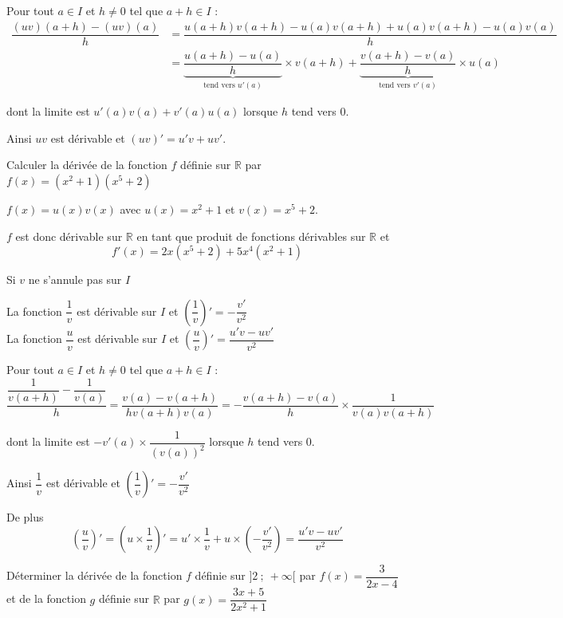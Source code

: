 \documentclass[french]{book}
\newcommand{\R}{\mathbb {R}}
\begin{document}
\begin{demo}
Pour tout $a\in I$ et $h\neq 0$ tel que $a+h\in I$ :
\begin{align*}
\dfrac{(uv)(a+h)-(uv)(a)}{h}&=\dfrac{u(a+h)v(a+h)-u(a)v(a+h)+u(a)v(a+h)-u(a)v(a)}{h}\\
&=\underbrace{\dfrac{u(a+h)-u(a)}{h}}_{\text{tend vers } u'(a)}\times v(a+h)+\underbrace{\dfrac{v(a+h)-v(a)}{h}}_{\text{tend vers } v'(a)}\times u(a)
\end{align*}

dont la limite est $u'(a)v(a)+v'(a)u(a)$ lorsque $h$ tend vers 0.

Ainsi $uv$ est dérivable et $(uv)'=u'v+uv'$.
\end{demo}

\begin{exemple}
Calculer la dérivée de la fonction $f$ définie sur $\R$ par $f(x)=(x^{2}+1)(x^{5}+2)$
\end{exemple}


$f(x)=u(x)v(x)$ avec $u(x)=x^{2}+1$ et $v(x)=x^{5}+2$.

$f$ est donc dérivable sur $\R$ en tant que produit de fonctions dérivables sur $\R$ et
\[f'(x)=2x(x^{5}+2)+5x^{4}(x^{2}+1)\]


\begin{prop}
Si $v$ ne s'annule pas sur $I$

La fonction $\dfrac{1}{v}$ est dérivable sur $I$ et  $\left(\dfrac{1}{v}\right)'=-\dfrac{v'}{v^{2}}$\\
La fonction $\dfrac{u}{v}$ est dérivable sur $I$ et  $\left(\dfrac{u}{v}\right)'=\dfrac{u'v-uv'}{v^{2}}$
\end{prop}

\begin{demo}
Pour tout $a\in I$ et $h\neq 0$ tel que $a+h\in I$ :
\[\dfrac{\dfrac{1}{v(a+h)}-\dfrac{1}{v(a)}}{h}=\dfrac{v(a)-v(a+h)}{hv(a+h)v(a)}=-\dfrac{v(a+h)-v(a)}{h}\times \dfrac{1}{v(a)v(a+h)}\]

dont la limite est $-v'(a)\times \dfrac{1}{(v(a))^{2}}$ lorsque $h$ tend vers 0.

Ainsi $\dfrac{1}{v}$ est dérivable et $\left(\dfrac{1}{v}\right)'=-\dfrac{v'}{v^{2}}$

De plus \[\left(\dfrac{u}{v}\right)'=\left(u\times \dfrac{1}{v}\right)'=u'\times \dfrac{1}{v}+u\times \left(-\dfrac{v'}{v^{2}}\right)=\dfrac{u'v-uv'}{v^{2}}\]
\end{demo}

\begin{exemple}
Déterminer la dérivée de la fonction $f$ définie sur $]2~;~+\infty[$ par $f(x)=\dfrac{3}{2x-4}$ et de la fonction $g$ définie sur $\R$ par $g(x)=\dfrac{3x+5}{2x^{2}+1}$
\end{exemple}
\end{document}
